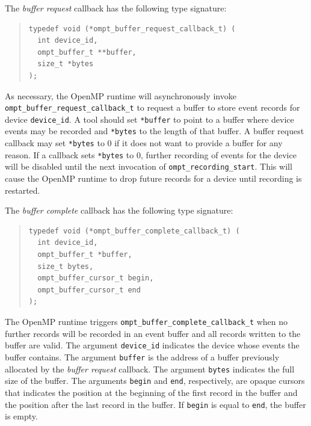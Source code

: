 \documentclass{article}
\begin{document}
The \emph{buffer request} callback has the following type signature:
\begin{quote}
\begin{verbatim}
typedef void (*ompt_buffer_request_callback_t) (
  int device_id,
  ompt_buffer_t **buffer,
  size_t *bytes
);
\end{verbatim}
\end{quote}
As necessary, the OpenMP runtime will asynchronously invoke \verb|ompt_buffer_request_callback_t| to request a buffer to store event records for device \verb|device_id|.
A tool should set \verb|*buffer| to point to a buffer where device events may be recorded and \verb|*bytes| to the length of that buffer.
A buffer request callback  may set \verb|*bytes| to 0 if it does not want to provide a buffer for any reason. If a callback sets \verb|*bytes| to 0, further recording of events for the device will be disabled until the next invocation of \verb|ompt_recording_start|. This will cause the OpenMP runtime to drop future records for a device until recording is restarted.

The \emph{buffer complete} callback has the following type signature: 
\begin{quote}
\begin{verbatim}
typedef void (*ompt_buffer_complete_callback_t) (
  int device_id, 
  ompt_buffer_t *buffer,
  size_t bytes,
  ompt_buffer_cursor_t begin,
  ompt_buffer_cursor_t end
);
\end{verbatim}
\end{quote}
The OpenMP runtime triggers \verb|ompt_buffer_complete_callback_t| when no further records will be recorded in an event buffer and all records written to the buffer are valid. 
The argument \verb|device_id| indicates the device whose events the buffer contains. The argument \verb|buffer| is the address of a buffer previously allocated by the \emph{buffer request} callback. The argument \verb|bytes| indicates the full size of the buffer. The arguments \verb|begin| and \verb|end|, respectively, are opaque cursors that indicates the position at the beginning of the first record in the buffer and the position after the last record in the buffer. If \verb|begin| is equal to \verb|end|, the buffer is empty. 
\end{document}
